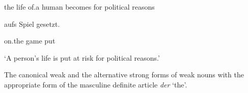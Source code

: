 \begin{styleMoutonExampleAlpha}
the  life    of.a  human  becomes  for  political  reasons
\end{styleMoutonExampleAlpha}

\begin{styleMoutonExampleAlpha}
aufs    Spiel  gesetzt.
\end{styleMoutonExampleAlpha}

\begin{styleMoutonExampleAlpha}
on.the  game  put
\end{styleMoutonExampleAlpha}

\begin{styleMoutonExampleAlpha}
‘A person’s life is put at risk for political reasons.’
\end{styleMoutonExampleAlpha}

\begin{styleMoutonCaption}%
\begin{table}
\caption{The canonical weak and the alternative strong forms of weak nouns with the appropriate form of the masculine definite article \textit{der} ‘the’.}
\label{tab:1}
\end{table}\end{styleMoutonCaption}

\tablefirsthead{}

